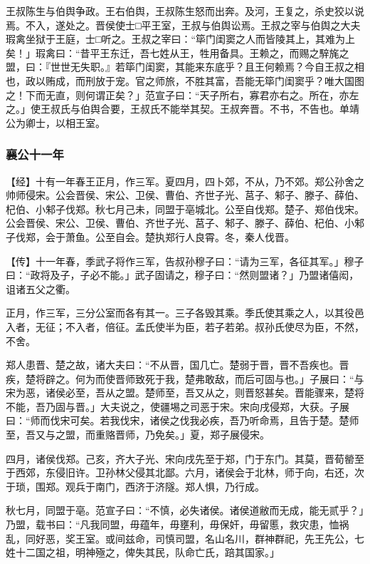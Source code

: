 \documentclass[]{article}
\begin{document}
王叔陈生与伯舆争政。王右伯舆，王叔陈生怒而出奔。及河，王复之，杀史狡以说焉。不入，遂处之。晋侯使士□平王室，王叔与伯舆讼焉。王叔之宰与伯舆之大夫瑕禽坐狱于王庭，士□听之。王叔之宰曰：``筚门闺窦之人而皆陵其上，其难为上矣！」瑕禽曰：``昔平王东迁，吾七姓从王，牲用备具。王赖之，而赐之騂旄之盟，曰：『世世无失职。』若筚门闺窦，其能来东底乎？且王何赖焉？今自王叔之相也，政以贿成，而刑放于宠。官之师旅，不胜其富，吾能无筚门闺窦乎？唯大国图之！下而无直，则何谓正矣？」范宣子曰：``天子所右，寡君亦右之。所在，亦左之。」使王叔氏与伯舆合要，王叔氏不能举其契。王叔奔晋。不书，不告也。单靖公为卿士，以相王室。

\hypertarget{header-n1952}{%
\subsubsection{襄公十一年}\label{header-n1952}}

【经】十有一年春王正月，作三军。夏四月，四卜郊，不从，乃不郊。郑公孙舍之帅师侵宋。公会晋侯、宋公、卫侯、曹伯、齐世子光、莒子、邾子、滕子、薛伯、杞伯、小邾子伐郑。秋七月己未，同盟于亳城北。公至自伐郑。楚子、郑伯伐宋。公会晋侯、宋公、卫侯、曹伯、齐世子光、莒子、邾子、滕子、薛伯、杞伯、小邾子伐郑，会于萧鱼。公至自会。楚执郑行人良霄。冬，秦人伐晋。

【传】十一年春，季武子将作三军，告叔孙穆子曰：``请为三军，各征其军。」穆子曰：``政将及子，子必不能。」武子固请之，穆子曰：``然则盟诸？」乃盟诸僖闳，诅诸五父之衢。

正月，作三军，三分公室而各有其一。三子各毁其乘。季氏使其乘之人，以其役邑入者，无征；不入者，倍征。孟氏使半为臣，若子若弟。叔孙氏使尽为臣，不然，不舍。

郑人患晋、楚之故，诸大夫曰：``不从晋，国几亡。楚弱于晋，晋不吾疾也。晋疾，楚将辟之。何为而使晋师致死于我，楚弗敢敌，而后可固与也。」子展曰：``与宋为恶，诸侯必至，吾从之盟。楚师至，吾又从之，则晋怒甚矣。晋能骤来，楚将不能，吾乃固与晋。」大夫说之，使疆埸之司恶于宋。宋向戌侵郑，大获。子展曰：``师而伐宋可矣。若我伐宋，诸侯之伐我必疾，吾乃听命焉，且告于楚。楚师至，吾又与之盟，而重赂晋师，乃免矣。」夏，郑子展侵宋。

四月，诸侯伐郑。己亥，齐大子光、宋向戌先至于郑，门于东门。其莫，晋荀罃至于西郊，东侵旧许。卫孙林父侵其北鄙。六月，诸侯会于北林，师于向，右还，次于琐，围郑。观兵于南门，西济于济隧。郑人惧，乃行成。

秋七月，同盟于亳。范宣子曰：``不慎，必失诸侯。诸侯道敝而无成，能无贰乎？」乃盟，载书曰：``凡我同盟，毋蕴年，毋壅利，毋保奸，毋留慝，救灾患，恤祸乱，同好恶，奖王室。或间兹命，司慎司盟，名山名川，群神群祀，先王先公，七姓十二国之祖，明神殛之，俾失其民，队命亡氏，踣其国家。」
\end{document}
